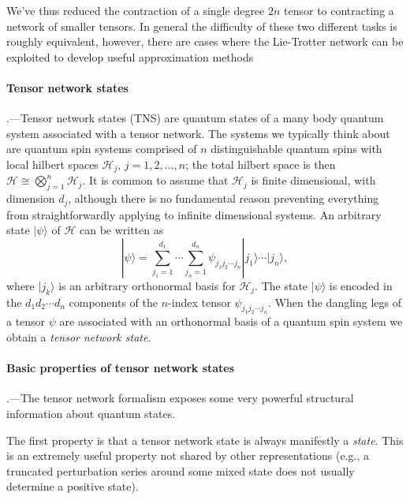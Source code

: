 \documentclass[prl,twocolumn,lengthcheck,superscriptaddress]{revtex4-1}
\theoremstyle{definition}
\theoremstyle{remark}
\begin{document}
We've thus reduced the contraction of a single degree $2n$ tensor to contracting a network of smaller tensors. In general the difficulty of these two different tasks is roughly equivalent, however, there are cases where the Lie-Trotter network can be exploited to develop useful approximation methods


\paragraph{Tensor network states}\hspace{-1em}.---Tensor network states (TNS) are quantum states of a many body quantum system associated with a tensor network. The systems we typically think about are quantum spin systems comprised of $n$ distinguishable quantum spins with local hilbert spaces $\mathcal{H}_j$, $j = 1, 2, \ldots, n$; the total hilbert space is then $\mathcal{H}\cong \bigotimes_{j=1}^{n} \mathcal{H}_j$. It is common to assume that $\mathcal{H}_j$ is finite dimensional, with dimension $d_j$, although there is no fundamental reason preventing everything from straightforwardly applying to infinite dimensional systems. An arbitrary state $|\psi\rangle$ of $\mathcal{H}$ can be written as
\begin{equation}
	|\psi\rangle = \sum_{j_1 = 1}^{d_1}\cdots \sum_{j_{n} = 1}^{d_{n} } \psi_{j_1j_2 \cdots j_{n}}|j_1\rangle \cdots |j_{n}\rangle,
\end{equation} 
where $|j_k\rangle$ is an arbitrary orthonormal basis for $\mathcal{H}_j$. The state $|\psi\rangle$ is encoded in the $d_1d_2\cdots d_n$ components of the $n$-index tensor $\psi_{j_1j_2 \cdots j_{n}}$.  When the dangling legs of a tensor $\psi$ are associated with an orthonormal basis of a quantum spin system we obtain a \emph{tensor network state}.

\paragraph{Basic properties of tensor network states}\hspace{-1em}.---The tensor network formalism exposes some very powerful structural information about quantum states. 

The first property is that a tensor network state is always manifestly a \emph{state}. This is an extremely useful property not shared by other representations (e.g., a truncated perturbation series around some mixed state does not usually determine a positive state).
\end{document}
